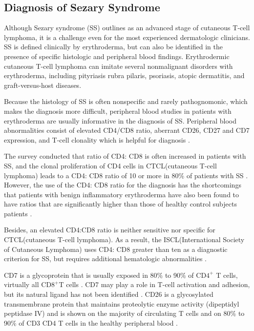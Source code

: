 \subsection{ Diagnosis of Sezary Syndrome}

Although Sezary syndrome (SS) outlines as an advanced stage of cutaneous T-cell lymphoma, it is a challenge even for the most experienced dermatologic clinicians. SS is defined clinically by erythroderma, but can also be identified in the presence of specific histologic and peripheral blood findings. Erythrodermic cutaneous T-cell lymphoma can imitate several nonmalignant disorders with erythroderma, including pityriasis rubra pilaris, psoriasis, atopic dermatitis, and graft-versus-host diseases.\cite{nagler}

Because the histology of SS is often nonspecific and rarely pathognomonic, which makes the diagnosis more difficult, peripheral blood studies in patients with erythroderma are usually informative in the diagnosis of SS. Peripheral blood abnormalities consist of elevated CD4/CD8 ratio, aberrant CD26, CD27 and CD7 expression, and T-cell clonality which is helpful for diagnosis \cite{nagler}.

The survey conducted that ratio of CD4: CD8 is often increased in patients with SS, and the clonal proliferation of CD4 cells in CTCL(cutaneous T-cell lymphoma) leads to a CD4: CD8 ratio of 10 or more in  80\% of patients with SS  \cite{nagler-12}. However, the use of the CD4: CD8 ratio for the diagnosis has the shortcomings that patients with benign inflammatory erythroderma have also been found to have ratios that are significantly higher than those of healthy control subjects patients\cite{nagler-13} \cite{nagler-14}.

Besides, an elevated CD4:CD8 ratio is neither sensitive  \cite{nagler-15}  nor specific for CTCL(cutaneous T-cell lymphoma). As a result, the ISCL(International Society of Cutaneous Lymphoma) uses CD4: CD8 greater than ten as a diagnostic criterion for SS, but requires additional hematologic abnormalities \cite{nagler}.    

CD7 is a glycoprotein that is usually exposed in 80\% to 90\% of CD$4 ^{+}$ T cells, virtually all CD$8 ^{+}$T  cells \cite{nagler-15}. CD7 may play a role in T-cell activation and adhesion, but its natural ligand has not been identified \cite{nagler}. CD26 is a glycosylated transmembrane protein that maintains proteolytic enzyme activity (dipeptidyl peptidase IV) and is shown on the majority of circulating T cells and on 80\% to 90\% of CD3 CD4 T cells in the healthy peripheral blood \cite{nagler-28}\cite{nagler-29}. 

